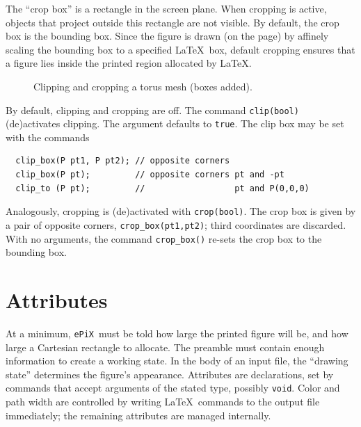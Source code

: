 \documentclass[12pt]{report}
\newcommand{\code}[1]{\texttt{#1}}
\newcommand{\ePiX}{\code{ePiX}}
\begin{document}
The ``crop box'' is a rectangle in the screen plane.
When cropping is active, objects that project outside this rectangle
are not visible.  By default, the crop box is the bounding
box. Since the figure is drawn (on the page) by
affinely scaling the bounding box to a specified \LaTeX\ box, default
cropping ensures that a figure lies inside the printed region
allocated by \LaTeX.
\begin{figure}[hbt]
  \begin{center}
    \hspace*{0.75in}
    \qquad
    
  \end{center}
  \caption{Clipping and cropping a torus mesh (boxes added).}
  \label{fig:crop}
\end{figure}

By default, clipping and cropping are off. The command
\code{clip(bool)} (de)activates clipping. The argument defaults to
\code{true}. The clip box may be set with the commands
\begin{verbatim}
  clip_box(P pt1, P pt2); // opposite corners
  clip_box(P pt);         // opposite corners pt and -pt
  clip_to (P pt);         //                  pt and P(0,0,0)
\end{verbatim}
Analogously, cropping is (de)activated with \code{crop(bool)}. The crop
box is given by a pair of opposite corners, \code{crop\_box(pt1,pt2)};
third coordinates are discarded. With no arguments, the command
\code{crop\_box()} re-sets the crop box to the bounding box.


\section{Attributes}

At a minimum, \ePiX\ must be told how large the printed figure will
be, and how large a Cartesian rectangle to allocate. The preamble must
contain enough information to create a working state.  In the body of
an input file, the ``drawing state'' determines the figure's
appearance. Attributes are declarations, set by commands that accept
arguments of the stated type, possibly \code{void}. Color and path
width are controlled by writing \LaTeX\ commands to the output file
immediately; the remaining attributes are managed internally.
\end{document}
